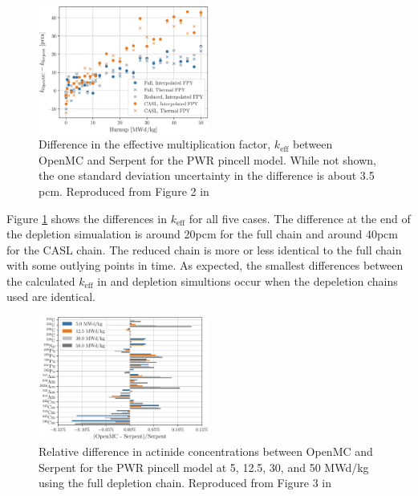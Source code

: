 \begin{figure}[htpb]
    \centering
    \includegraphics[width=0.5\textwidth]{figs/ch2/serpent_openmc_keff.png}
    \caption[Difference in the effective multiplication factor, $k_\text{eff}$
    between OpenMC and Serpent for the PWR pincell model.]{Difference in the
    effective multiplication factor, $k_\text{eff}$ between OpenMC and Serpent
    for the PWR pincell model. While not shown, the one standard deviation
    uncertainty in the difference is about 3.5 pcm. Reproduced from Figure 2 in
    \cite{romano_depletion_2021}}
    \label{fig:pwr-serpent-openmc-keff}
\end{figure}

Figure \ref{fig:pwr-serpent-openmc-keff} shows the differences in $k_\text{eff}$
for all five cases. The difference at the end of the depletion simualation is
around 20pcm for the full chain and around 40pcm for the CASL chain. The
reduced chain is more or less identical to the full chain with some outlying
points in time. As expected, the smallest differences between the calculated
$k_\text{eff}$ in \SerpentTWO and \OpenMC depletion simultions occur when the
depeletion chains used are identical.

\begin{figure}[htpb]
    \centering
    \includegraphics[width=0.5\textwidth]{figs/ch2/serpent_openmc_actinides.png}
    \caption[Relative difference in actinide concentrations bewteen OpenMC and
    Serpent for the PWR pincell model.]{Relative difference in actinide
    concentrations between OpenMC and Serpent for the PWR pincell model at 5,
    12.5, 30, and 50 MWd/kg using the full depletion chain. Reproduced from
    Figure 3 in \cite{romano_depletion_2021}}
    \label{fig:pwr-serpent-openmc-actinides}
\end{figure}

